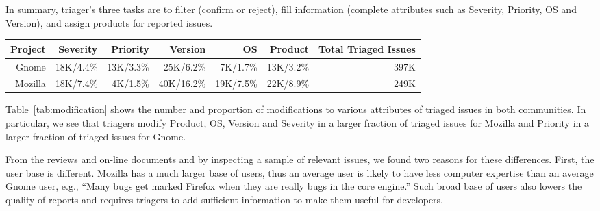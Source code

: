 \documentclass[conference]{IEEEtran}
\begin{document}
In summary, triager's three tasks are to filter (confirm or
reject), fill information (complete attributes such as Severity, Priority, OS and
Version), and assign products for reported issues.

\begin{comment}
\begin{figure*}[ht]
\begin{centering}
\vspace{.1in}\epsfig{file=triage_practice.eps, width=6.8in,height=1.2in}
\end{centering}
\caption{Number of issues by triage task}
\label{fig:modification}
\end{figure*}
\end{comment}


\begin{table*}[ht]
\centering
\caption{The Number and Proportion of Issues with a Modified Attribute}\label{tab:modification}
\begin{tabular}{|r|r|r|r|r|r|r|}  \hline
  Project & Severity & Priority & Version & OS  & Product & Total Triaged Issues\\ \hline
  Gnome & 18K/4.4\% & 13K/3.3\% & 25K/6.2\% & 7K/1.7\% & 13K/3.2\% & 397K\\
  Mozilla & 18K/7.4\% & 4K/1.5\% & 40K/16.2\% & 19K/7.5\% & 22K/8.9\% & 249K\\
  \hline
\end{tabular}
\vspace{-0.1in}
\end{table*}

Table~\ref{tab:modification} shows the number and proportion of modifications to various
attributes of triaged issues in both communities. In particular, we see that
triagers modify Product, OS, Version and Severity in a larger fraction of
triaged issues for Mozilla and Priority in a larger fraction of triaged issues
for Gnome.

From the reviews and on-line documents and by inspecting a sample of
relevant issues, we found two reasons for these differences.  First,
the user base is different.  Mozilla has a much larger base of
users, thus an average user is likely to have less computer
expertise than an average Gnome user, e.g., ``Many bugs get
  marked Firefox when they are really bugs in the core engine.''
Such broad base of users also lowers the quality of reports and
requires triagers to add sufficient information to make them useful
for developers.
\end{document}
